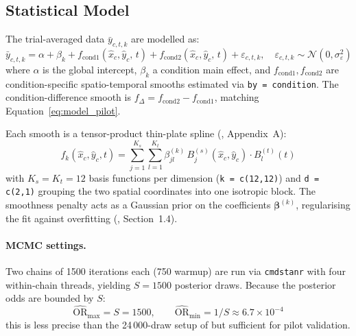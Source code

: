 \documentclass[12pt, a4paper]{article}
\begin{document}
\subsection{Statistical Model}\label{sec:brms_model}

The trial-averaged data $\bar{y}_{c,t,k}$ are modelled as:
\begin{equation}\label{eq:brms}
  \bar{y}_{c,t,k}
    = \alpha + \beta_k
    + f_{\text{cond1}}(\hat{x}_c, \hat{y}_c,\, t)
    + f_{\text{cond2}}(\hat{x}_c, \hat{y}_c,\, t)
    + \varepsilon_{c,t,k},
  \quad \varepsilon_{c,t,k} \sim \mathcal{N}(0, \sigma_\varepsilon^2)
\end{equation}
where $\alpha$ is the global intercept, $\beta_k$ a condition main effect,
and $f_{\text{cond1}}, f_{\text{cond2}}$ are condition-specific
spatio-temporal smooths estimated via \texttt{by = condition}.
The condition-difference smooth is $f_\Delta = f_{\text{cond2}} - f_{\text{cond1}}$,
matching Equation~\eqref{eq:model_pilot}.

Each smooth is a tensor-product thin-plate spline
(\citealt{Nalborczyk2025}, Appendix~A):
\begin{equation}\label{eq:basis}
  f_k(\hat{x}_c, \hat{y}_c, t)
    = \sum_{j=1}^{K_s}\sum_{l=1}^{K_t}
      \beta_{jl}^{(k)}\,
      B_j^{(s)}(\hat{x}_c, \hat{y}_c)\cdot B_l^{(t)}(t)
\end{equation}
with $K_s = K_t = 12$ basis functions per dimension (\texttt{k = c(12,12)})
and \texttt{d = c(2,1)} grouping the two spatial coordinates into one
isotropic block.
The smoothness penalty acts as a Gaussian prior on the coefficients
$\boldsymbol{\beta}^{(k)}$, regularising the fit against overfitting
(\citealt{Nalborczyk2025}, Section~1.4).

\paragraph{MCMC settings.}
Two chains of 1500 iterations each (750 warmup) are run via
\texttt{cmdstanr} with four within-chain threads, yielding
$S = 1500$ posterior draws.
Because the posterior odds are bounded by $S$:
\begin{equation}
  \widehat{\mathrm{OR}}_\text{max} = S = 1500,
  \qquad
  \widehat{\mathrm{OR}}_\text{min} = 1/S \approx 6.7 \times 10^{-4}
\end{equation}
this is less precise than the 24\,000-draw setup of \citet{Nalborczyk2025}
but sufficient for pilot validation.
\end{document}
